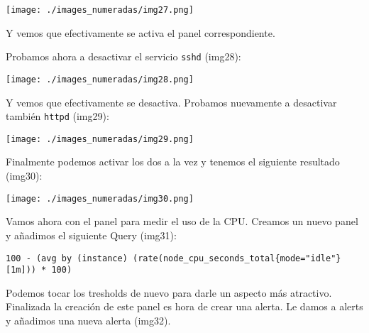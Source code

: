 \begin{Shaded}
\begin{Highlighting}[]
\end{Highlighting}
\end{Shaded}

\texttt{[image: ./images\_numeradas/img27.png]}

Y vemos que efectivamente se activa el panel correspondiente.

Probamos ahora a desactivar el servicio \texttt{sshd} (img28):

\begin{Shaded}
\begin{Highlighting}[]
\end{Highlighting}
\end{Shaded}

\texttt{[image: ./images\_numeradas/img28.png]}

Y vemos que efectivamente se desactiva. Probamos nuevamente a desactivar
también \texttt{httpd} (img29):

\begin{Shaded}
\begin{Highlighting}[]
\end{Highlighting}
\end{Shaded}

\texttt{[image: ./images\_numeradas/img29.png]}

Finalmente podemos activar los dos a la vez y tenemos el siguiente
resultado (img30):

\begin{Shaded}
\begin{Highlighting}[]
\end{Highlighting}
\end{Shaded}

\texttt{[image: ./images\_numeradas/img30.png]}

Vamos ahora con el panel para medir el uso de la CPU. Creamos un nuevo
panel y añadimos el siguiente Query (img31):

\begin{verbatim}
100 - (avg by (instance) (rate(node_cpu_seconds_total{mode="idle"}[1m])) * 100)
\end{verbatim}

Podemos tocar los tresholds de nuevo para darle un aspecto más
atractivo. Finalizada la creación de este panel es hora de crear una
alerta. Le damos a alerts y añadimos una nueva alerta (img32).


